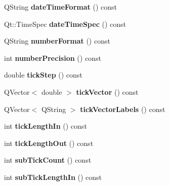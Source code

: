 \begin{DoxyCompactItemize}
\item 
Q\+String {\bfseries date\+Time\+Format} () const \hypertarget{classQCPAxis_a132b54ae184a12ed24c9af24f53dc70b}{}\label{classQCPAxis_a132b54ae184a12ed24c9af24f53dc70b}

\item 
Qt\+::\+Time\+Spec {\bfseries date\+Time\+Spec} () const \hypertarget{classQCPAxis_afdd04c56ed29a9d948f840fc76f0d383}{}\label{classQCPAxis_afdd04c56ed29a9d948f840fc76f0d383}

\item 
Q\+String {\bfseries number\+Format} () const \hypertarget{classQCPAxis_ae6729b40845b29ffa5a440aa53cec215}{}\label{classQCPAxis_ae6729b40845b29ffa5a440aa53cec215}

\item 
int {\bfseries number\+Precision} () const \hypertarget{classQCPAxis_a91cb2825060ac79a889296377fe0c7c1}{}\label{classQCPAxis_a91cb2825060ac79a889296377fe0c7c1}

\item 
double {\bfseries tick\+Step} () const \hypertarget{classQCPAxis_a0e6120d24266544441ab691f316a1b03}{}\label{classQCPAxis_a0e6120d24266544441ab691f316a1b03}

\item 
Q\+Vector$<$ double $>$ {\bfseries tick\+Vector} () const \hypertarget{classQCPAxis_a5b00b14f480f926df976cc6c52309e78}{}\label{classQCPAxis_a5b00b14f480f926df976cc6c52309e78}

\item 
Q\+Vector$<$ Q\+String $>$ {\bfseries tick\+Vector\+Labels} () const \hypertarget{classQCPAxis_a64e6fa81f943ad33dcaf3fa606687b93}{}\label{classQCPAxis_a64e6fa81f943ad33dcaf3fa606687b93}

\item 
int {\bfseries tick\+Length\+In} () const \hypertarget{classQCPAxis_a59265d65c5034695ac2578bccbbb0f4a}{}\label{classQCPAxis_a59265d65c5034695ac2578bccbbb0f4a}

\item 
int {\bfseries tick\+Length\+Out} () const \hypertarget{classQCPAxis_ae1b3d7473f50ba8544b2027c1cdc80f2}{}\label{classQCPAxis_ae1b3d7473f50ba8544b2027c1cdc80f2}

\item 
int {\bfseries sub\+Tick\+Count} () const \hypertarget{classQCPAxis_a290b4c1375476826daa10e914cb71dab}{}\label{classQCPAxis_a290b4c1375476826daa10e914cb71dab}

\item 
int {\bfseries sub\+Tick\+Length\+In} () const \hypertarget{classQCPAxis_a052e6ab2ada7e87fa5e5831dcbd4a517}{}\label{classQCPAxis_a052e6ab2ada7e87fa5e5831dcbd4a517}


\end{DoxyCompactItemize}
